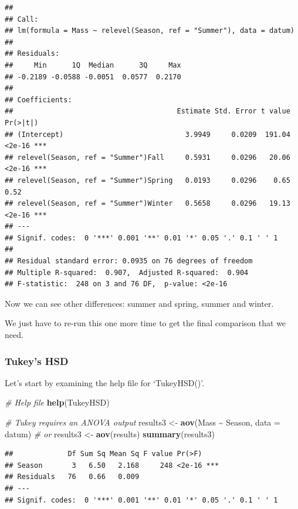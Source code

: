 \documentclass[
]{article}
\newenvironment{Shaded}{\begin{snugshade}}{\end{snugshade}}
\newcommand{\AttributeTok}[1]{\textcolor[rgb]{0.13,0.29,0.53}{#1}}
\newcommand{\CommentTok}[1]{\textcolor[rgb]{0.56,0.35,0.01}{\textit{#1}}}
\newcommand{\FunctionTok}[1]{\textcolor[rgb]{0.13,0.29,0.53}{\textbf{#1}}}
\newcommand{\NormalTok}[1]{#1}
\newcommand{\OtherTok}[1]{\textcolor[rgb]{0.56,0.35,0.01}{#1}}
\newcommand{\SpecialCharTok}[1]{\textcolor[rgb]{0.81,0.36,0.00}{\textbf{#1}}}
\begin{document}
\begin{verbatim}
## 
## Call:
## lm(formula = Mass ~ relevel(Season, ref = "Summer"), data = datum)
## 
## Residuals:
##     Min      1Q  Median      3Q     Max 
## -0.2189 -0.0588 -0.0051  0.0577  0.2170 
## 
## Coefficients:
##                                       Estimate Std. Error t value Pr(>|t|)    
## (Intercept)                             3.9949     0.0209  191.04   <2e-16 ***
## relevel(Season, ref = "Summer")Fall     0.5931     0.0296   20.06   <2e-16 ***
## relevel(Season, ref = "Summer")Spring   0.0193     0.0296    0.65     0.52    
## relevel(Season, ref = "Summer")Winter   0.5658     0.0296   19.13   <2e-16 ***
## ---
## Signif. codes:  0 '***' 0.001 '**' 0.01 '*' 0.05 '.' 0.1 ' ' 1
## 
## Residual standard error: 0.0935 on 76 degrees of freedom
## Multiple R-squared:  0.907,  Adjusted R-squared:  0.904 
## F-statistic:  248 on 3 and 76 DF,  p-value: <2e-16
\end{verbatim}

Now we can see other differences: summer and spring, summer and winter.

We just have to re-run this one more time to get the final comparison
that we need.

\subsubsection{Tukey's HSD}\label{tukeys-hsd}

Let's start by examining the help file for `TukeyHSD()'.

\begin{Shaded}
\begin{Highlighting}[]
\CommentTok{\# Help file}
\FunctionTok{help}\NormalTok{(TukeyHSD)}

\CommentTok{\# Tukey requires an ANOVA output}
\NormalTok{results3 }\OtherTok{\textless{}{-}} \FunctionTok{aov}\NormalTok{(Mass }\SpecialCharTok{\textasciitilde{}}\NormalTok{ Season, }\AttributeTok{data =}\NormalTok{ datum) }\CommentTok{\# or}
\NormalTok{results3 }\OtherTok{\textless{}{-}} \FunctionTok{aov}\NormalTok{(results)}
\FunctionTok{summary}\NormalTok{(results3)}
\end{Highlighting}
\end{Shaded}

\begin{verbatim}
##             Df Sum Sq Mean Sq F value Pr(>F)    
## Season       3   6.50   2.168     248 <2e-16 ***
## Residuals   76   0.66   0.009                   
## ---
## Signif. codes:  0 '***' 0.001 '**' 0.01 '*' 0.05 '.' 0.1 ' ' 1
\end{verbatim}
\end{document}
